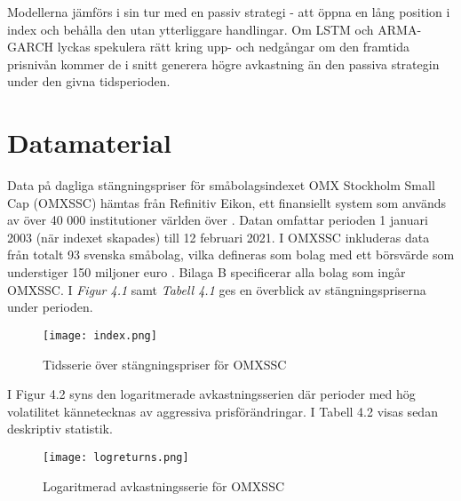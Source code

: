 \documentclass[11pt]{article}
\numberwithin{equation}{section}
\numberwithin{table}{section}
\numberwithin{figure}{section}
\begin{document}
Modellerna jämförs i sin tur med en passiv strategi - att öppna en lång position i index och behålla den utan ytterliggare handlingar. Om LSTM och ARMA-GARCH lyckas spekulera rätt kring upp- och nedgångar om den framtida prisnivån kommer de i snitt generera högre avkastning än den passiva strategin under den givna tidsperioden.

\newpage
\section{Datamaterial}

Data på dagliga stängningspriser för småbolagsindexet OMX Stockholm Small Cap (OMXSSC) hämtas från Refinitiv Eikon, ett finansiellt system som används av över 40 000 institutioner världen över \parencite{Eikon}. Datan omfattar perioden 1 januari 2003 (när indexet skapades) till 12 februari 2021. I OMXSSC inkluderas data från totalt 93 svenska småbolag, vilka defineras som bolag med ett börsvärde som understiger 150 miljoner euro \parencite{smabalagsdefinition}. Bilaga B specificerar alla bolag som ingår OMXSSC. I \emph{Figur 4.1} samt \textit{Tabell 4.1} ges en överblick av stängningspriserna under perioden. 

\begin{figure}[H]
\caption{Tidsserie över stängningspriser för OMXSSC}
\texttt{[image: index.png]}
\centering
\end{figure}


\begin{table}[H]
\caption{Deskprivtiv statistik över stängningspriser för OMXSSC}
\end{table}

I Figur 4.2 syns den logaritmerade avkastningsserien där perioder med hög volatilitet kännetecknas av aggressiva prisförändringar. I Tabell 4.2 visas sedan deskriptiv statistik. 

\begin{figure}[H]
\caption{Logaritmerad avkastningsserie för OMXSSC}
\texttt{[image: logreturns.png]}
\centering
\end{figure}
\end{document}
